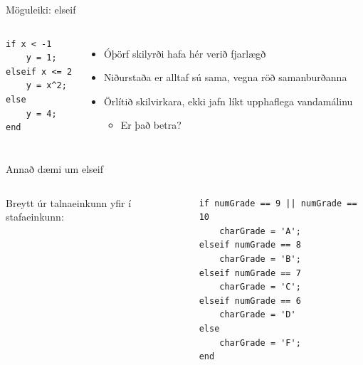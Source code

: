 \documentclass{beamer}
\begin{document}
\begin{frame}[fragile]{Möguleiki: elseif}
\begin{columns}
\begin{verbatim}
if x < -1
    y = 1;
elseif x <= 2
    y = x^2;
else
    y = 4;
end
\end{verbatim}
\begin{itemize}
 \item Óþörf skilyrði hafa hér verið fjarlægð
 \item Niðurstaða er alltaf sú sama, vegna röð samanburðanna
 \item Örlítið skilvirkara, ekki jafn líkt upphaflega vandamálinu
 \begin{itemize}
  \item Er það betra?
 \end{itemize}
\end{itemize}
\end{columns}
\end{frame}

\begin{frame}[fragile]{Annað dæmi um elseif}
\begin{columns}
Breytt úr talnaeinkunn yfir í stafaeinkunn:
\begin{verbatim}
if numGrade == 9 || numGrade == 10
    charGrade = 'A';
elseif numGrade == 8
    charGrade = 'B';
elseif numGrade == 7
    charGrade = 'C';
elseif numGrade == 6
    charGrade = 'D'
else
    charGrade = 'F';
end
\end{verbatim}
\end{columns}
\end{frame}
\end{document}
